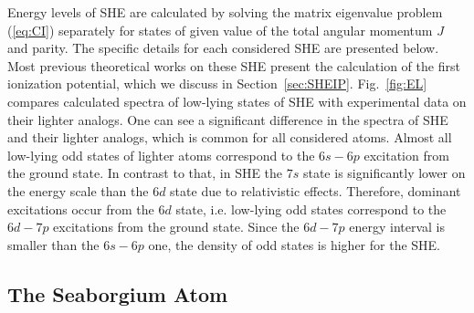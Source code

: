 \documentclass[10pt,a4paper, twoside, openright]{report}
\begin{document}
Energy levels of SHE are calculated by solving the matrix eigenvalue problem (\ref{eq:CI}) separately for states of given value of the total angular momentum $J$ and parity. The specific details for each considered SHE are presented below. Most previous theoretical works on these SHE present the calculation of the first ionization potential, which we discuss in Section~\ref{sec:SHEIP}. Fig.~\ref{fig:EL} compares calculated spectra of low-lying states of SHE with experimental data on their lighter analogs. One can see a significant difference in the spectra of SHE and their lighter analogs, which is common for all considered atoms. Almost all low-lying odd states of lighter atoms correspond to the $6s-6p$ excitation from the ground state. In contrast to that, in SHE the $7s$ state is significantly lower on the energy scale than the $6d$ state due to relativistic effects. Therefore, dominant excitations occur from the $6d$ state, i.e. low-lying odd states correspond to the $6d-7p$ excitations from the ground state. Since the $6d-7p$ energy interval is smaller than the $6s-6p$ one, the density of odd states is higher for the SHE. 


\subsection{The Seaborgium Atom} \label{sec:Sg}
\end{document}
